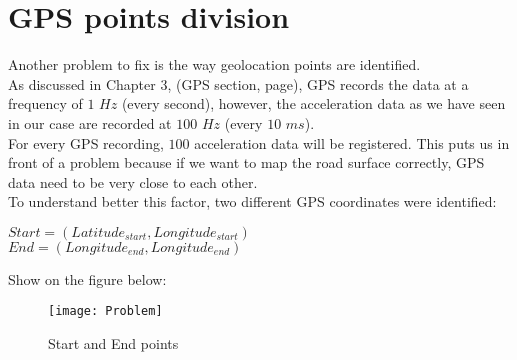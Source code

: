 \documentclass{standalone}
\begin{document}
\section{GPS points division} \label{GPS points division}
Another problem to fix is the way geolocation points are identified.\\
As discussed in Chapter 3, (GPS section, page), GPS records the data at a frequency of $1$ $Hz$ (every second), however, the acceleration data as we have seen in our case are recorded at $100$ $Hz$ (every $10$ $ms$).\\
For every GPS recording, $100$ acceleration data will be registered. This puts us in front of a problem because if we want to map the road surface correctly, GPS data need to be very close to each other.\\
To understand better this factor, two different GPS coordinates were identified:

\begin{center}
 $Start = (Latitude_{start}, Longitude_{start})$\\
 $End = (Longitude_{end}, Longitude_{end})$
\end{center}

\noindent Show on the figure below:
\vspace{0.15cm}
\begin{figure}[H]	

\centering
\texttt{[image: Problem]} \label{GPS Points Problem}
 \caption{Start and End points}
  \label{fig:GPS Points Problem}
\end{figure}
\end{document}

